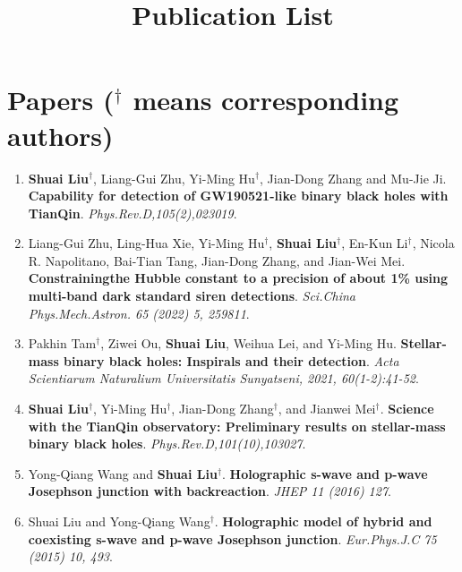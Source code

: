 \documentclass[12pt,a4paper,sans]{article}%
\title{\vspace{-2.5cm}\Huge Publication List \vspace{-2.2em}}
\date{}
\begin{document}
\maketitle
\section*{Papers ($^{\dagger}$ means corresponding authors)}
\begin{enumerate}[1.]
    \item \textbf{Shuai Liu}$^{\dagger}$, Liang-Gui Zhu, Yi-Ming Hu$^{\dagger}$, Jian-Dong Zhang and Mu-Jie Ji.
     \textbf{Capability for detection of GW190521-like binary black holes with TianQin}.
        \emph{Phys.Rev.D,105(2),023019}.
    \item Liang-Gui Zhu, Ling-Hua Xie, Yi-Ming Hu$^{\dagger}$, \textbf{Shuai Liu}$^{\dagger}$, En-Kun Li$^{\dagger}$,
        Nicola R. Napolitano, Bai-Tian Tang, Jian-Dong Zhang, and Jian-Wei Mei. \textbf{Constrainingthe Hubble constant
        to a precision of about 1\% using multi-band dark standard siren detections}. \emph{Sci.China Phys.Mech.Astron.
        65 (2022) 5, 259811}.
    \item Pakhin Tam$^{\dagger}$, Ziwei Ou, \textbf{Shuai Liu}, Weihua Lei, and Yi-Ming Hu. \textbf{Stellar-mass binary
        black holes: Inspirals and their detection}. \emph{Acta Scientiarum Naturalium Universitatis Sunyatseni, 2021, 60(1-2):41-52}.
    \item \textbf{Shuai Liu}$^{\dagger}$, Yi-Ming Hu$^{\dagger}$, Jian-Dong Zhang$^{\dagger}$, and Jianwei
        Mei$^{\dagger}$. \textbf{Science with the TianQin observatory: Preliminary results on stellar-mass binary black
        holes}. \emph{Phys.Rev.D,101(10),103027}.
    \item Yong-Qiang Wang and \textbf{Shuai Liu}$^{\dagger}$. \textbf{Holographic s-wave and p-wave Josephson junction
        with backreaction}. \emph{JHEP 11 (2016) 127}.
    \item Shuai Liu and Yong-Qiang Wang$^{\dagger}$. \textbf{Holographic model of hybrid and coexisting s-wave and
        p-wave Josephson junction}. \emph{Eur.Phys.J.C 75 (2015) 10, 493}.
\end{enumerate}
\end{document}
